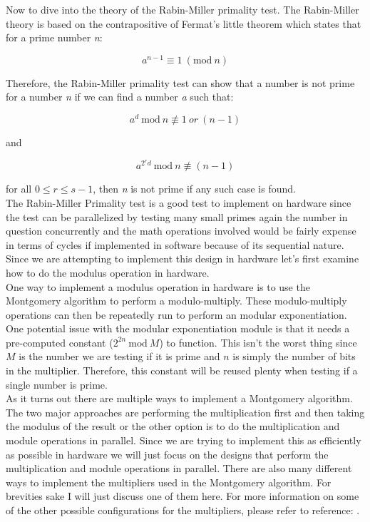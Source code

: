 \documentclass[journal]{IEEEtran}
\begin{document}
Now to dive into the theory of the Rabin-Miller primality test. The Rabin-Miller theory is based on the contrapositive of Fermat's little theorem which states that for a prime number \textit{n}:

	\begin{displaymath}
		a^{n-1} \equiv 1\ (\textrm{mod}\ n)
	\end{displaymath}

Therefore, the Rabin-Miller primality test can show that a number is not prime for a number \textit{n} if we can find a number \textit{a} such that:

	\begin{displaymath}
		a^d\ \textrm{mod}\ n\not \equiv 1\ or\ (n-1)
	\end{displaymath}
		
and

	\begin{displaymath}
		a^{2^rd}\ \textrm{mod}\ n \not \equiv (n-1)
	\end{displaymath}

for all $0 \le r \le s-1$, then \textit{n} is not prime if any such case is found. \cite{wiki_miller-rabin} \\

The Rabin-Miller Primality test is a good test to implement on hardware since the test can be parallelized by testing many small primes again the number in question concurrently and the math operations involved would be fairly expense in terms of cycles if implemented in software because of its sequential nature. Since we are attempting to implement this design in hardware let's first examine how to do the modulus operation in hardware. \\

One way to implement a modulus operation in hardware is to use the Montgomery algorithm to perform a modulo-multiply. These modulo-multiply operations can then be repeatedly run to perform an modular exponentiation. One potential issue with the modular exponentiation module is that it needs a pre-computed constant ($2^{2n}\ \textrm{mod}\ M$) to function. This isn't the worst thing since $M$ is the number we are testing if it is prime and $n$ is simply the number of bits in the multiplier. Therefore, this constant will be reused plenty when testing if a single number is prime. \\

As it turns out there are multiple ways to implement a Montgomery algorithm. The two major approaches are performing the multiplication first and then taking the modulus of the result or the other option is to do the multiplication and module operations in parallel. Since we are trying to implement this as efficiently as possible in hardware we will just focus on the designs that perform the multiplication and module operations in parallel. There are also many different ways to implement the multipliers used in the Montgomery algorithm. For brevities sake I will just discuss one of them here. For more information on some of the other possible configurations for the multipliers, please refer to reference: \cite{daly}. \\
\end{document}
